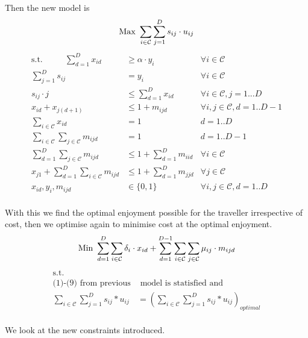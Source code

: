 \documentclass[12pt]{article}
\begin{document}
Then the new model is 
\begin{equation*}
\text{Max } \sum_{i \in \mathcal{C}} \sum_{j=1}^{D} s_{ij} \cdot u_{ij}\\
\end{equation*}
\begin{align}
\text{s.t.~~~~~~~~}
\sum_{d=1}^{D} x_{id} & \geq \alpha \cdot y_{i} & \forall i \in \mathcal{C}\\
\sum_{j=1}^{D} s_{ij} &= y_{i} & \forall i \in \mathcal{C}\\
s_{ij} \cdot j &\leq \sum_{d=1}^{D} x_{id} & \forall i \in \mathcal{C}, j=1...D\\
x_{id} + x_{j(d+1)} & \leq 1 + m_{ijd} & \forall i,j \in \mathcal{C}, d = 1..D-1 \\
\sum_{i \in \mathcal{C}} x_{id} &= 1 & d = 1..D \\
\sum_{i \in \mathcal{C}} \sum_{j \in \mathcal{C}} m_{ijd} &= 1 & d = 1..D-1 \\
\sum_{d=1}^{D} \sum_{j \in \mathcal{C}} m_{ijd} &\leq 1 + \sum_{d=1}^{D} m_{iid} & \forall i \in \mathcal{C} \\
x_{j1} + \sum_{d=1}^{D} \sum_{i \in \mathcal{C}} m_{ijd} &\leq 1 + \sum_{d=1}^{D} m_{jjd} & \forall j \in \mathcal{C}\\
x_{id}, y_{i}, m_{ijd} & \in \{0,1\} & \forall i, j \in \mathcal{C}, d = 1..D
\end{align}\\
With this we find the optimal enjoyment possible for the traveller irrespective of cost, then we optimise again to minimise cost at the optimal enjoyment.
\begin{equation*}
\text{Min } \sum_{d=1}^{D} \sum_{i \in \mathcal{C}} \delta_{i} \cdot x_{id} + \sum_{d=1}^{D-1} \sum_{i \in \mathcal{C}} \sum_{j \in \mathcal{C}} \mu_{ij} \cdot m_{ijd}\\
\end{equation*}
\begin{align*}
\text{s.t.~~~~~~~~} & \\
\text{(1)-(9) from previous} &\text{ model is statisfied and} \\
\sum_{i \in \mathcal{C}} \sum_{j=1}^{D} s_{ij} * u_{ij} &= (\sum_{i \in \mathcal{C}} \sum_{j=1}^{D} s_{ij} * u_{ij})_{optimal}
\end{align*}\\
We look at the new constraints introduced.\\
\vspace{5mm}\\
\end{document}
